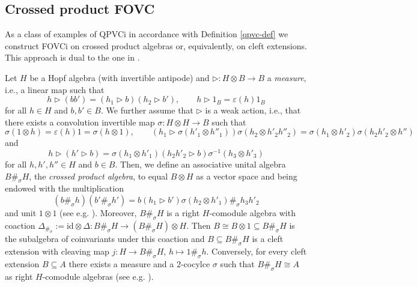 \documentclass{article}
\theoremstyle{definition}
\begin{document}
\subsection{Crossed product FOVC}\label{sec:crossed}

As a class of examples of QPVCi in accordance with Definition \ref{qpvc-def} we construct FOVCi on crossed product algebras or, equivalently, on cleft extensions. This approach is dual to the one in \cite{SciWeb}.

Let $H$ be a Hopf algebra (with invertible antipode) and $\rhd\colon H\otimes B\to B$ a \textit{measure}, i.e., a linear map such that
$$
h\rhd(bb')=(h_1\rhd b)(h_2\rhd b'),\qquad h\rhd 1_B=\varepsilon(h)1_B
$$
for all $h\in H$ and $b,b'\in B$. We further assume that $\rhd$ is a weak action, i.e., that there exists a convolution invertible map $\sigma\colon H\otimes H\to B$ such that
$$
\sigma(1\otimes h)=\varepsilon(h)1=\sigma(h\otimes 1),\qquad
(h_1\rhd\sigma(h'_1\otimes h''_1))\sigma(h_2\otimes h'_2h''_2)
=\sigma(h_1\otimes h'_2)\sigma(h_2h'_2\otimes h'')
$$
and
$$
h\rhd(h'\rhd b)=\sigma(h_1\otimes h'_1)(h_2h'_2\rhd b)\sigma^{-1}(h_3\otimes h'_3)
$$
for all $h,h',h''\in H$ and $b\in B$. Then, we define an associative unital algebra $B\#_\sigma H$, the \textit{crossed product algebra}, to equal $B\otimes H$ as a vector space and being endowed with the multiplication
$$
(b\#_\sigma h)(b'\#_\sigma h')
=b(h_1\rhd b')\sigma(h_2\otimes h'_1)\#_\sigma h_3h'_2
$$
and unit $1\otimes 1$ (see e.g. \cite[Lemma 7.1.2]{mont}). Moreover, $B\#_\sigma H$ is a right $H$-comodule algebra with coaction $\Delta_{\#_\sigma}:=\mathrm{id}\otimes\Delta\colon B\#_\sigma H\to (B\#_\sigma H)\otimes H$. Then $B\cong B\otimes 1\subseteq B\#_\sigma H$ is the subalgebra of coinvariants under this coaction and $B\subseteq B\#_\sigma H$ is a cleft extension with cleaving map $j\colon H\to B\#_\sigma H$, $h\mapsto 1\#_\sigma h$. Conversely, for every cleft extension $B\subseteq A$ there exists a measure and a $2$-cocylce $\sigma$ such that $B\#_\sigma H\cong A$ as right $H$-comodule algebras (see e.g. \cite[Theorem 7.2.2]{mont}).
\end{document}
